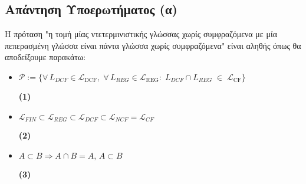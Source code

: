 \subsection{Απάντηση Υποερωτήματος (α)}
\label{ssec:Solution_3.1}
\doublespacing
Η πρόταση "η τομή μίας ντετερμινιστικής γλώσσας χωρίς συμφραζόμενα με μία πεπερασμένη γλώσσα είναι πάντα γλώσσα
χωρίς συμφραζόμενα" είναι αληθής όπως θα αποδείξουμε παρακάτω:


\reducevspace\reducevspace\reducevspace


\begin{tcolorbox}[colback=yellow!15!white, colframe=blue!50!white,
	fonttitle=\bfseries\Large, title = Απόδειξη]
	\centering
\begin{itemize}
	\itemsep0em

	\item $\mathcal{P} := \{\forall\,L_{DCF}\in\mathcal L_{\mathrm{DCF}},\;\forall\,L_{REG}\in\mathcal
	L_{\mathrm{REG}}:\;L_{DCF}\cap L_{REG}\;\in\;\mathcal L_{\mathrm{CF}}\}$
	\reducevspace\reducevspace\reducevspace\reducevspace\reducevspace\reducevspace
	\reducevspace\reducevspace\reducevspace\reducevspace\reducevspace\reducevspace
	\reducevspace\reducevspace\reducevspace\reducevspace\reducevspace\reducevspace
	\reducevspace\reducevspace\reducevspace\reducevspace\reducevspace\reducevspace
	\begin{flushright}\hypertarget{3.1.1}{\bf{(1)}}\end{flushright}


	\item $\mathcal{L}_{FIN} \subset \mathcal{L}_{REG} \subset \mathcal{L}_{DCF} \subset \mathcal{L}_{NCF} =
	\mathcal{L}_{CF}$
	\reducevspace\reducevspace\reducevspace\reducevspace\reducevspace\reducevspace
	\reducevspace\reducevspace\reducevspace\reducevspace\reducevspace\reducevspace
	\reducevspace\reducevspace\reducevspace\reducevspace\reducevspace\reducevspace
	\reducevspace\reducevspace\reducevspace\reducevspace\reducevspace\reducevspace
	\begin{flushright}\hypertarget{3.1.2}{\bf{(2)}}\end{flushright}

	\item $A \subset B \Rightarrow A \cap B = A,\, Α\subset B$
	\reducevspace\reducevspace\reducevspace\reducevspace\reducevspace\reducevspace
	\reducevspace\reducevspace\reducevspace\reducevspace\reducevspace\reducevspace
	\reducevspace\reducevspace\reducevspace\reducevspace\reducevspace\reducevspace
	\reducevspace\reducevspace\reducevspace\reducevspace\reducevspace\reducevspace
	\begin{flushright}\hypertarget{3.1.3}{\bf{(3)}}\end{flushright}


\end{itemize}
\end{tcolorbox}
